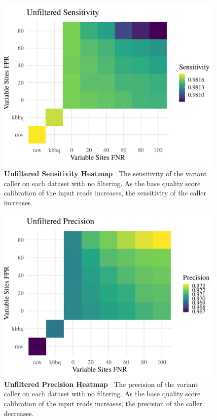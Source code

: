 \documentclass{report}
\newcommand{\titlecaption}[2]{\caption[#1]{\textbf{#1 \textbar\,} #2}}
\begin{document}
\begin{figure}
\centering
\includegraphics[width = .7\textwidth]{sensitivity.pdf}
\titlecaption{Unfiltered Sensitivity Heatmap}{The sensitivity of the variant caller on each dataset with no filtering. As the base quality score calibration of the input reads increases, the sensitivity of the caller increases.}
\label{fig:vc_sens}
\end{figure}

\begin{figure}
\centering
\includegraphics[width = .7\textwidth]{precision.pdf}
\titlecaption{Unfiltered Precision Heatmap}{The precision of the variant caller on each dataset with no filtering. As the base quality score calibration of the input reads increases, the precision of the caller decreases.}
\label{fig:vc_prec}
\end{figure}
\end{document}
